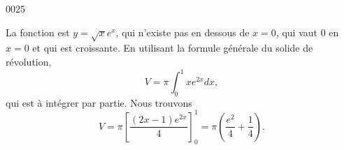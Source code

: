\begin{corrige}{0025}

La fonction est $y=\sqrt{x}e^x$, qui n'existe pas en dessous de $x=0$, qui vaut $0$ en $x=0$ et qui est croissante. En utilisant la formule générale du solide de révolution, 
\begin{equation}
	V=\pi\int_0^1x e^{2x}dx,
\end{equation}
qui est à intégrer par partie. Nous trouvons
\begin{equation}
	V=\pi\left[ \frac{ (2x-1) e^{2x} }{ 4 } \right]_0^1=\pi\left( \frac{ e^2 }{ 4 }+\frac{1}{ 4 } \right).
\end{equation}

\end{corrige}
